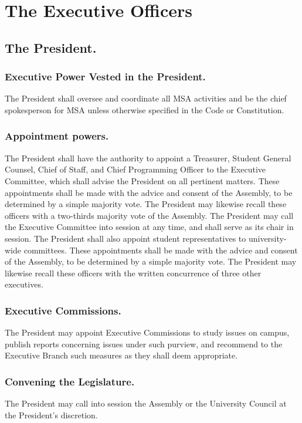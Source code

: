 
\section{The Executive Officers}

\subsection{The President.}
\subsubsection{Executive Power Vested in the President.}
The President shall oversee and coordinate all MSA activities and be the chief spokesperson for MSA unless otherwise specified in the Code or Constitution.
\subsubsection{Appointment powers.}
The President shall have the authority to appoint a Treasurer, Student General Counsel, Chief of Staff, and Chief Programming Officer to the Executive Committee, which shall advise the President on all pertinent matters.  These appointments shall be made with the advice and consent of the Assembly, to be determined by a simple majority vote.  The President may likewise recall these officers with a two-thirds majority vote of the Assembly.  The President may call the Executive Committee into session at any time, and shall serve as its chair in session.
The President shall also appoint student representatives to university-wide committees.  These appointments shall be made with the advice and consent of the Assembly, to be determined by a simple majority vote.  The President may likewise recall these officers with the written concurrence of three other executives.
	
\subsubsection{Executive Commissions.}
The President may appoint Executive Commissions to study issues on campus, publish reports concerning issues under such purview, and recommend to the Executive Branch such measures as they shall deem appropriate.

\subsubsection{Convening the Legislature.}
The President may call into session the Assembly or the University Council at the President's discretion.

